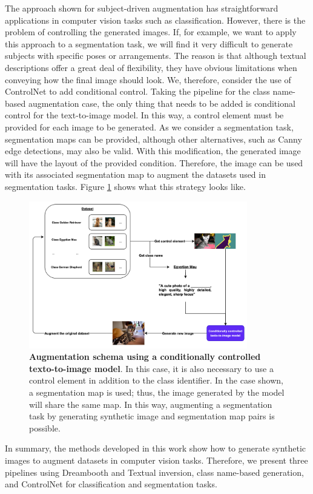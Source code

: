 The approach shown for subject-driven augmentation has straightforward applications in computer vision tasks such as classification. However, there is the problem of controlling the generated images. If, for example, we want to apply this approach to a segmentation task, we will find it very difficult to generate subjects with specific poses or arrangements. The reason is that although textual descriptions offer a great deal of flexibility, they have obvious limitations when conveying how the final image should look. We, therefore, consider the use of ControlNet to add conditional control. Taking the pipeline for the class name-based augmentation case, the only thing that needs to be added is conditional control for the text-to-image model. In this way, a control element must be provided for each image to be generated. As we consider a segmentation task, segmentation maps can be provided, although other alternatives, such as Canny edge detections, may also be valid. With this modification, the generated image will have the layout of the provided condition. Therefore, the image can be used with its associated segmentation map to augment the datasets used in segmentation tasks. Figure \ref{fig:controlNetPipe} shows what this strategy looks like.

\begin{figure}
    \centering
    \includegraphics[width=0.85\textwidth]{Pictures/controlNetPipe.png} 
    \caption{\textbf{Augmentation schema using a conditionally controlled texto-to-image model}. In this case, it is also necessary to use a control element in addition to the class identifier. In the case shown, a segmentation map is used; thus, the image generated by the model will share the same map. In this way, augmenting a segmentation task by generating synthetic image and segmentation map pairs is possible.}
    \label{fig:controlNetPipe}
\end{figure}

In summary, the methods developed in this work show how to generate synthetic images to augment datasets in computer vision tasks. Therefore, we present three pipelines using Dreambooth and Textual inversion, class name-based generation, and ControlNet for classification and segmentation tasks.